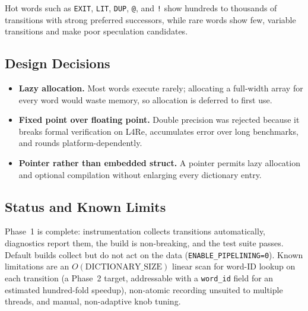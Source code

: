 Hot words such as \texttt{EXIT}, \texttt{LIT}, \texttt{DUP}, \texttt{@}, and
\texttt{!} show hundreds to thousands of transitions with strong preferred
successors, while rare words show few, variable transitions and make poor
speculation candidates.

\subsection{Design Decisions}

\begin{itemize}
  \item \textbf{Lazy allocation.} Most words execute rarely; allocating a
        full-width array for every word would waste memory, so allocation is
        deferred to first use.
  \item \textbf{Fixed point over floating point.} Double precision was rejected
        because it breaks formal verification on L4Re, accumulates error over
        long benchmarks, and rounds platform-dependently.
  \item \textbf{Pointer rather than embedded struct.} A pointer permits lazy
        allocation and optional compilation without enlarging every dictionary
        entry.
\end{itemize}

\subsection{Status and Known Limits}

Phase~1 is complete: instrumentation collects transitions automatically,
diagnostics report them, the build is non-breaking, and the test suite passes.
Default builds collect but do not act on the data
(\lstinline{ENABLE_PIPELINING=0}). Known limitations are an
$O(\text{DICTIONARY\_SIZE})$ linear scan for word-ID lookup on each transition
(a Phase~2 target, addressable with a \lstinline{word_id} field for an
estimated hundred-fold speedup), non-atomic recording unsuited to multiple
threads, and manual, non-adaptive knob tuning.

